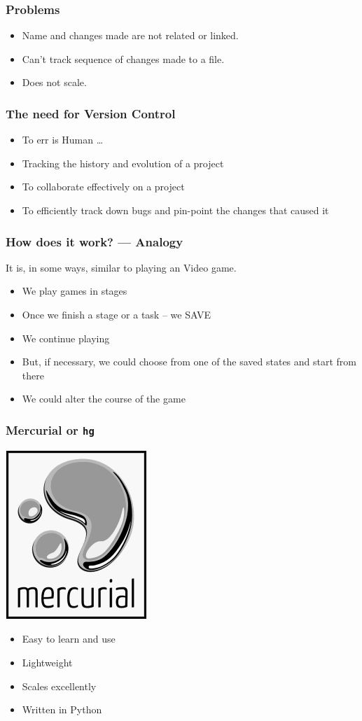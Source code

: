 \documentclass[14pt,compress]{beamer}
\newcommand{\typ}[1]{\lstinline{#1}}
\begin{document}
\begin{frame}[fragile]
  \frametitle{Problems}  
  \begin{block}{}    
  \begin{itemize}
  \item Name and changes made are not related or linked. 
  \item Can't track sequence of changes made to a file. 
  \item Does not scale. 
  \end{itemize}
    \end{block}
\end{frame}

\begin{frame}[fragile]
  \frametitle{The need for Version Control}
  \begin{itemize}
  \item \alert{To err is Human} \ldots 
  \item Tracking the history and evolution of a project
  \item To collaborate effectively on a project
  \item To efficiently track down bugs and pin-point the changes that
    caused it 
  \end{itemize}
\end{frame}

\begin{frame}[fragile]
  \frametitle{How does it work? --- Analogy}
  It is, in some ways, similar to playing an Video game.
  \begin{itemize}
  \item We play games in stages
  \item Once we finish a stage or a task -- \alert{we SAVE}
  \item We continue playing
  \item But, if necessary, we could choose from one of the saved
    states and start from there
  \item We could alter the course of the game
  \end{itemize}
\end{frame}


\begin{frame}
  \frametitle{Mercurial or \typ{hg}}
  \begin{center}
    \includegraphics[height=.75in,interpolate=true]{images/mercurial_logo}
  \end{center}
  \begin{itemize}
  \item Easy to learn and use
  \item Lightweight
  \item Scales excellently
  \item Written in Python
  \end{itemize}
\end{frame}
\end{document}
